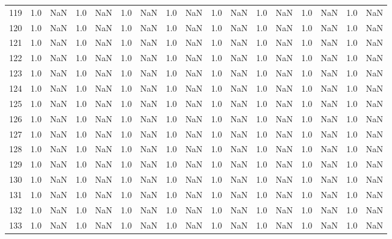 \begin{tabular}{lrrrrrrrrrrrrrrrr}
    119 &  1.0 & NaN &   1.0 &   NaN &   1.0 &   NaN &   1.0 &   NaN &   1.0 &   NaN &   1.0 &   NaN &   1.0 &   NaN &   1.0 &   NaN \\
    120 &  1.0 & NaN &   1.0 &   NaN &   1.0 &   NaN &   1.0 &   NaN &   1.0 &   NaN &   1.0 &   NaN &   1.0 &   NaN &   1.0 &   NaN \\
    121 &  1.0 & NaN &   1.0 &   NaN &   1.0 &   NaN &   1.0 &   NaN &   1.0 &   NaN &   1.0 &   NaN &   1.0 &   NaN &   1.0 &   NaN \\
    122 &  1.0 & NaN &   1.0 &   NaN &   1.0 &   NaN &   1.0 &   NaN &   1.0 &   NaN &   1.0 &   NaN &   1.0 &   NaN &   1.0 &   NaN \\
    123 &  1.0 & NaN &   1.0 &   NaN &   1.0 &   NaN &   1.0 &   NaN &   1.0 &   NaN &   1.0 &   NaN &   1.0 &   NaN &   1.0 &   NaN \\
    124 &  1.0 & NaN &   1.0 &   NaN &   1.0 &   NaN &   1.0 &   NaN &   1.0 &   NaN &   1.0 &   NaN &   1.0 &   NaN &   1.0 &   NaN \\
    125 &  1.0 & NaN &   1.0 &   NaN &   1.0 &   NaN &   1.0 &   NaN &   1.0 &   NaN &   1.0 &   NaN &   1.0 &   NaN &   1.0 &   NaN \\
    126 &  1.0 & NaN &   1.0 &   NaN &   1.0 &   NaN &   1.0 &   NaN &   1.0 &   NaN &   1.0 &   NaN &   1.0 &   NaN &   1.0 &   NaN \\
    127 &  1.0 & NaN &   1.0 &   NaN &   1.0 &   NaN &   1.0 &   NaN &   1.0 &   NaN &   1.0 &   NaN &   1.0 &   NaN &   1.0 &   NaN \\
    128 &  1.0 & NaN &   1.0 &   NaN &   1.0 &   NaN &   1.0 &   NaN &   1.0 &   NaN &   1.0 &   NaN &   1.0 &   NaN &   1.0 &   NaN \\
    129 &  1.0 & NaN &   1.0 &   NaN &   1.0 &   NaN &   1.0 &   NaN &   1.0 &   NaN &   1.0 &   NaN &   1.0 &   NaN &   1.0 &   NaN \\
    130 &  1.0 & NaN &   1.0 &   NaN &   1.0 &   NaN &   1.0 &   NaN &   1.0 &   NaN &   1.0 &   NaN &   1.0 &   NaN &   1.0 &   NaN \\
    131 &  1.0 & NaN &   1.0 &   NaN &   1.0 &   NaN &   1.0 &   NaN &   1.0 &   NaN &   1.0 &   NaN &   1.0 &   NaN &   1.0 &   NaN \\
    132 &  1.0 & NaN &   1.0 &   NaN &   1.0 &   NaN &   1.0 &   NaN &   1.0 &   NaN &   1.0 &   NaN &   1.0 &   NaN &   1.0 &   NaN \\
    133 &  1.0 & NaN &   1.0 &   NaN &   1.0 &   NaN &   1.0 &   NaN &   1.0 &   NaN &   1.0 &   NaN &   1.0 &   NaN &   1.0 &   NaN \\

\end{tabular}
